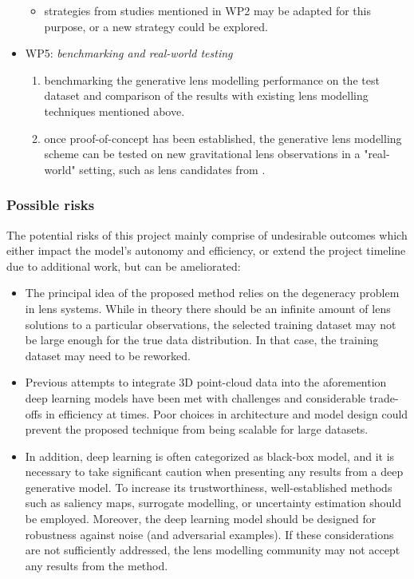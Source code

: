 \documentclass[a4paper,10pt]{article}
\begin{document}
\begin{itemize}[leftmargin=*, noitemsep]
\begin{itemize}[leftmargin=*]
\item strategies from studies mentioned in WP2 may be adapted for this
purpose, or a new strategy could be explored.
\end{itemize}
\item WP5: \emph{benchmarking and real-world testing}
\begin{enumerate}[leftmargin=*]
\item benchmarking the generative lens modelling performance on the
test dataset and comparison of the results with existing lens
modelling techniques mentioned above.
\item once proof-of-concept has been established, the generative lens
modelling scheme can be tested on new gravitational lens
observations in a "real-world" setting, such as lens candidates
from \cite{Huang21,Storfer22}.
\end{enumerate}
\end{itemize}


\subsubsection{Possible risks}
\label{sec:org5faa5fe}

The potential risks of this project mainly comprise of undesirable
outcomes which either impact the model's autonomy and efficiency, or
extend the project timeline due to additional work, but can be
ameliorated:
\begin{itemize}[leftmargin=*, noitemsep]
\item The principal idea of the proposed method relies on the degeneracy
problem in lens systems. While in theory there should be an infinite
amount of lens solutions to a particular observations, the selected
training dataset may not be large enough for the true data
distribution. In that case, the training dataset may need to be
reworked.
\item Previous attempts to integrate 3D point-cloud data into the
aforemention deep learning models have been met with challenges and
considerable trade-offs in efficiency at times. Poor choices in
architecture and model design could prevent the proposed technique
from being scalable for large datasets.
\item In addition, deep learning is often categorized as black-box model,
and it is necessary to take significant caution when presenting any
results from a deep generative model. To increase its trustworthiness,
well-established methods such as saliency maps, surrogate modelling,
or uncertainty estimation should be employed. Moreover, the deep
learning model should be designed for robustness against noise (and
adversarial examples). If these considerations are not sufficiently
addressed, the lens modelling community may not accept any results
from the method.
\end{itemize}
\end{document}
